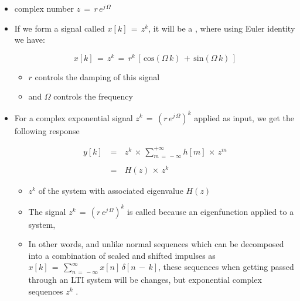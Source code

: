 \documentclass[12pt,a4paper]{book}
\begin{document}
\begin{itemize}

\item complex number $z \, = \, r \, e^{j \, \Omega}$

\item If we form a signal called $x[k] \, = \, z^{k}$, it will be a , where using Euler identity we have:

\begin{equation*}
x[k] \, = \, z^{k} \, = \, r^k \, \left[\, \text{cos}(\Omega \, k) \, + \, \text{sin}(\Omega \, k)  \,\right]
\end{equation*}

	\begin{itemize}
	\item $r$ controls the damping of this signal
	
	\item and $\Omega$ controls the frequency

	\end{itemize}


\item For a complex exponential signal $z^k \, = \, (r \, e^{j \, \Omega})^k$ applied as input, we get the following response

\begin{equation}
\begin{array}{rcl}
y[k] \, &=& \, z^k \, \times \, \displaystyle\sum_{m \, = \, - \infty}^{+ \infty} h[m] \, \times \, z^m \\ \\
&=& \, H(z) \, \times \, z^k  
\end{array}
\end{equation}

	\begin{itemize}
	\item $z^k$  of the system with associated eigenvalue $H(z)$ 
	
	
	\item The signal  $z^k \, = \, (r \, e^{j \, \Omega})^k$ is called  because an eigenfunction applied to a system, 	
	
	\item In other words, and unlike normal sequences which can be decomposed into a combination of scaled and shifted impulses as $x[k] \, = \, \displaystyle\sum\limits_{n \, = \, - \infty}^{\infty} x[n] \, \delta[n \, - \, k]$, these sequences when getting passed through an LTI system will be changes, but exponential complex sequences $z^k$ .	
	

\end{itemize}
\end{itemize}
\end{document}
